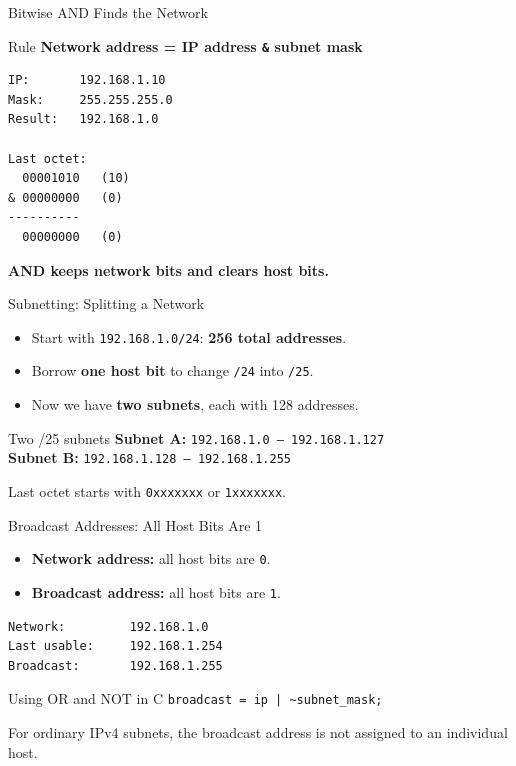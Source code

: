 \documentclass[aspectratio=169,11pt]{beamer}
\begin{document}
\begin{frame}[fragile]{Bitwise AND Finds the Network}
\begin{block}{Rule}
\centering \textbf{Network address = IP address \texttt{\&} subnet mask}
\end{block}
\begin{lstlisting}
IP:       192.168.1.10
Mask:     255.255.255.0
Result:   192.168.1.0

Last octet:
  00001010   (10)
& 00000000   (0)
----------
  00000000   (0)
\end{lstlisting}
\centering \textbf{AND keeps network bits and clears host bits.}
\end{frame}

\begin{frame}{Subnetting: Splitting a Network}
\begin{itemize}
\item Start with \texttt{192.168.1.0/24}: \textbf{256 total addresses}.
\item Borrow \textbf{one host bit} to change \texttt{/24} into \texttt{/25}.
\item Now we have \textbf{two subnets}, each with 128 addresses.
\end{itemize}
\vspace{0.35cm}
\begin{block}{Two /25 subnets}
\textbf{Subnet A:} \texttt{192.168.1.0 -- 192.168.1.127}\\[6pt]
\textbf{Subnet B:} \texttt{192.168.1.128 -- 192.168.1.255}
\end{block}
\vspace{0.25cm}
\centering Last octet starts with \texttt{0xxxxxxx} or \texttt{1xxxxxxx}.
\end{frame}

\begin{frame}[fragile]{Broadcast Addresses: All Host Bits Are 1}
\begin{itemize}
\item \textbf{Network address:} all host bits are \texttt{0}.
\item \textbf{Broadcast address:} all host bits are \texttt{1}.
\end{itemize}
\begin{lstlisting}
Network:         192.168.1.0
Last usable:     192.168.1.254
Broadcast:       192.168.1.255
\end{lstlisting}
\begin{block}{Using OR and NOT in C}
\centering \texttt{broadcast = ip | \~{}subnet\_mask;}
\end{block}
\small For ordinary IPv4 subnets, the broadcast address is not assigned to an individual host.
\end{frame}
\end{document}
